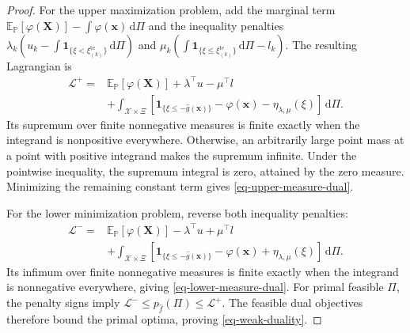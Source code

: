 \documentclass[review,11pt,3p,authoryear,nopreprintline]{elsarticle}
\begin{document}
\begin{proof}
  For the upper maximization problem, add the marginal term
  $\mathbb E_{\mathbb P}[\varphi(\bm X)]-\int\varphi(\bm x)\,\mathrm d\Pi$
  and the inequality penalties
  $\lambda_k(u_k-\int\mathbf1_{\{\xi<\xi_{(k)}^{\mathrm{te}}\}}\,\mathrm d\Pi)$ and
  $\mu_k(\int\mathbf1_{\{\xi\le \xi_{(k)}^{\mathrm{te}}\}}\,\mathrm d\Pi-l_k)$.
  The resulting Lagrangian is \citep[Section~5.1]{B.V04}
  \begin{equation}
    \begin{aligned}
      \mathcal L^+
      ={}&\mathbb E_{\mathbb P}[\varphi(\bm X)]
        +\lambda^\top u-\mu^\top l\\
        &+\int_{\mathcal X\times\Xi}
        [\mathbf1_{\{\xi\le -\hat g(\bm x)\}}
        -\varphi(\bm x)-\eta_{\lambda,\mu}(\xi)]\,\mathrm d\Pi.
    \end{aligned}
    \label{eq-upper-lagrangian}
  \end{equation}
  Its supremum over finite nonnegative measures is finite exactly when the integrand is nonpositive everywhere. Otherwise, an arbitrarily large point mass at a point with positive integrand makes the supremum infinite. Under the pointwise inequality, the supremum integral is zero, attained by the zero measure. Minimizing the remaining constant term gives \eqref{eq-upper-measure-dual}.

  For the lower minimization problem, reverse both inequality penalties:
  \begin{equation}
    \begin{aligned}
      \mathcal L^-
      ={}&\mathbb E_{\mathbb P}[\varphi(\bm X)]
        -\lambda^\top u+\mu^\top l\\
        &+\int_{\mathcal X\times\Xi}
        [\mathbf1_{\{\xi\le -\hat g(\bm x)\}}
        -\varphi(\bm x)+\eta_{\lambda,\mu}(\xi)]\,\mathrm d\Pi.
    \end{aligned}
    \label{eq-lower-lagrangian}
  \end{equation}
  Its infimum over finite nonnegative measures is finite exactly when the integrand is nonnegative everywhere, giving \eqref{eq-lower-measure-dual}. For primal feasible $\Pi$, the penalty signs imply
  $\mathcal L^-\le p_{\hat f}(\Pi)\le\mathcal L^+$.
  The feasible dual objectives therefore bound the primal optima, proving \eqref{eq-weak-duality}.
\end{proof}
\end{document}
